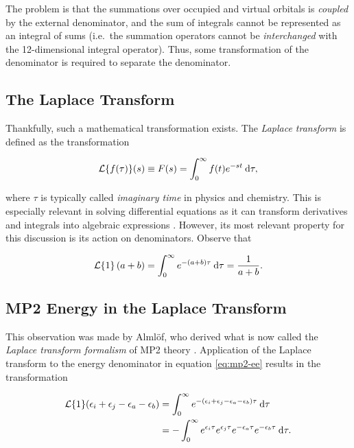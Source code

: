 \noindent The problem is that the summations over occupied and virtual orbitals
is \emph{coupled} by the external denominator, and the sum of integrals cannot
be represented as an integral of sums (i.e.\ the summation operators cannot be
\emph{interchanged} with the 12-dimensional integral operator). Thus, some
transformation of the denominator is required to separate the denominator.

\subsection{The Laplace Transform}

Thankfully, such a mathematical transformation exists. The \emph{Laplace
transform} is defined as the transformation

\begin{equation}
	\mathcal{L}\{ f(\tau) \}(s) \equiv F(s) = \int_0^{\infty} f(t) e^{-st} \:\mathrm{d} \tau,
\end{equation}

\noindent where $\tau$ is typically called \emph{imaginary time} in physics and
chemistry. This is especially relevant in solving differential equations as it
can transform derivatives and integrals into algebraic expressions
\cite{laplace}. However, its most relevant property for this discussion is its
action on denominators. Observe that

\begin{equation}
	\mathcal{L}\{ 1 \}\left( a + b \right) = \int_0^{\infty}e^{-(a + b)\tau} \:\mathrm{d} \tau = \frac{1}{a + b}.
\end{equation}

\subsection{MP2 Energy in the Laplace Transform}

This observation was made by Alml{\"o}f, who derived what is now called the
\emph{Laplace transform formalism} of MP2 theory \cite{almlof1, almlof2,
almlof3}. Application of the Laplace transform to the energy denominator
in equation \ref{eq:mp2-ee} results in the transformation

\begin{equation}
\begin{split}
\mathcal{L}\{1\}(\epsilon_i + \epsilon_j - \epsilon_a - \epsilon_b) &= \int_0^\infty e^{-(\epsilon_i + \epsilon_j - \epsilon_a - \epsilon_b)\tau} \:\mathrm{d} \tau \\
						    &= - \int_0^\infty e^{\epsilon_i\tau}e^{\epsilon_j\tau}e^{-\epsilon_a\tau}e^{-\epsilon_b\tau} \:\mathrm{d} \tau.
\end{split}
\end{equation}

